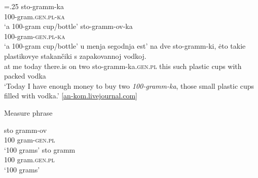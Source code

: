 \documentclass[output=paper]{langscibook}
\begin{document}
\ea\label{ex:khrizmann:11}\multicolsep=.25\baselineskip
    \ea\label{ex:khrizmann:11a}\gll sto-gramm-ka\\
    100-gram.\textsc{gen.pl}-\textsc{ka}\\
    \glt `a 100-gram cup/bottle'
    \ex\label{ex:khrizmann:11b}
    \gll sto-gramm-ov-ka\\
    100-gram-\textsc{gen.pl}-\textsc{ka}\\
    \glt `a 100-gram cup/bottle'
    \ex\label{ex:khrizmann:11c}
    \gll {\dots} u menja segodnja est' na dve sto-gramm-ki, ėto takie plastikovye stakančiki s zapakovannoj vodkoj.\\
    {} at me today there.is on two sto-gramm-ka.\textsc{gen.pl} this such plastic cups with packed vodka\\
    \glt `Today I have enough money to buy two \textit{100-gramm-ka}, those small plastic cups filled with vodka.' \hfill [\href{https://an-kom.livejournal.com/65452.html}{an-kom.livejournal.com}]
\z


\ex\label{ex:khrizmann:12} Measure phrase
    \begin{multicols}{2}
        \begin{xlist}
            \ex\label{ex:khrizmann:12a} \gll sto gramm-ov\\
            100 gram-\textsc{gen.pl}\\
            \glt `100 grams'
            \ex\label{ex:khrizmann:12b} \gll sto gramm\\
            100 gram.\textsc{gen.pl}\\
            \glt `100 grams'\\
        \end{xlist}
    \end{multicols}


\end{document}
